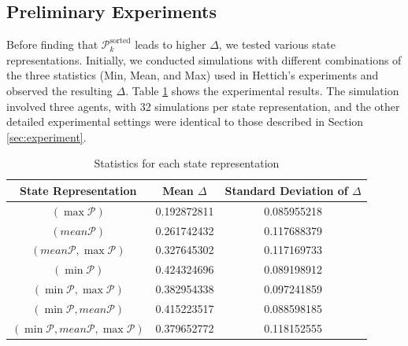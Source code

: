 \documentclass[runningheads]{llncs}
\begin{document}
\subsection{Preliminary Experiments}
    Before finding that \( \mathcal{P}^{\text{sorted}}_k \) leads to higher $\Delta$, we tested various state representations.
    Initially, we conducted simulations with different combinations of the three statistics (Min, Mean, and Max) used in Hettich's experiments and observed the resulting $\Delta$.
    Table \ref{tab:result_pre_experiment} shows the experimental results.
    The simulation involved three agents, with 32 simulations per state representation, and the other detailed experimental settings were identical to those described in Section \ref{sec:experiment}.
 
 
    \begin{table}[tb]
        \centering
        \caption{Statistics for each state representation}
        \label{tab:result_pre_experiment}
        \begin{tabular}{c|cc}
            \hline
            State Representation & Mean $\Delta$ & Standard Deviation of $\Delta$ \\
            \hline
            $(\max\mathcal{P})$ & 0.192872811 & 0.085955218 \\
            $(mean\mathcal{P})$ & 0.261742432 & 0.117688379 \\
            $(mean{\mathcal{P}},\max{\mathcal{P}})$ & 0.327645302 & 0.117169733 \\
            $(\min\mathcal{P})$ & 0.424324696 & 0.089198912 \\
            $(\min{\mathcal{P}},\max{\mathcal{P}})$ & 0.382954338 & 0.097241859 \\
            $(\min{\mathcal{P}},mean{\mathcal{P}})$ & 0.415223517 & 0.088598185 \\
            $(\min{\mathcal{P}},mean{\mathcal{P}},\max{\mathcal{P}})$ & 0.379652772 & 0.118152555 \\ \hline
        \end{tabular}
    \end{table}
\end{document}
